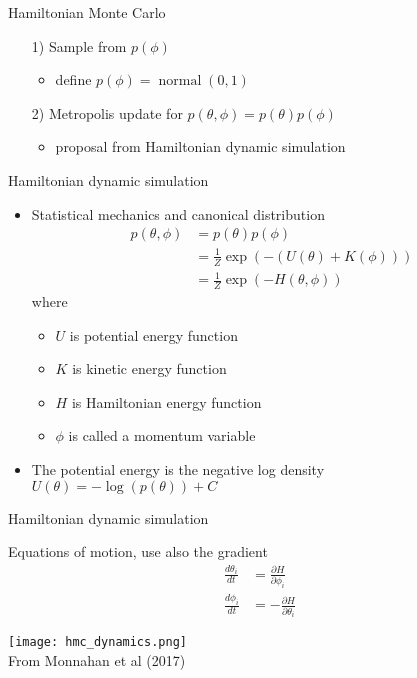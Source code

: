 \documentclass[finnish,english,t]{beamer}
\DeclareMathOperator{\normal}{normal}
\begin{document}
\begin{frame}{Hamiltonian Monte Carlo}

  \begin{itemize}
  \item[1)] Sample from $p(\phi)$
    \begin{itemize}
    \item define $p(\phi) = \normal(0,1)$
    \end{itemize}
  \item[2)] Metropolis update for $p(\theta,\phi)=p(\theta)p(\phi)$
    \begin{itemize}
    \item proposal from Hamiltonian dynamic simulation
    \end{itemize}
  
  \end{itemize}
  
\end{frame}

\begin{frame}{Hamiltonian dynamic simulation}

  \begin{itemize}
  \item Statistical mechanics and canonical distribution
    \begin{align*}
      p(\theta,\phi)&=p(\theta)p(\phi)\\
      &=\frac{1}{Z}\exp(-(U(\theta)+K(\phi)))\\
      &=\frac{1}{Z}\exp(-H(\theta,\phi))
    \end{align*}
    where
    \begin{itemize}
    \item $U$ is potential energy function
    \item $K$ is kinetic energy function
    \item $H$ is Hamiltonian energy function
    \item $\phi$ is called a momentum variable
    \end{itemize}
  \item<2-> The potential energy is the negative log density\\
    $U(\theta)=-\log(p(\theta))+C$
  \end{itemize}
  
  
\end{frame}

\begin{frame}{Hamiltonian dynamic simulation}

 Equations of motion, use also the gradient
  \begin{align*}
    \frac{d\theta_i}{dt} & = \frac{\partial H}{\partial \phi_i}\\
    \frac{d\phi_i}{dt} & = -\frac{\partial H}{\partial \theta_i}
  \end{align*}

  \texttt{[image: hmc\_dynamics.png]}\\
  {\footnotesize From Monnahan et al (2017)}
  
\end{frame}
\end{document}
